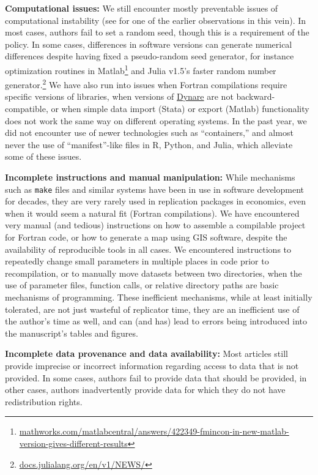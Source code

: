\documentclass[PP]{AEA}
\renewcommand{\subparagraph}[1]{\textbf{#1}}
\begin{document}
\subparagraph{Computational issues:}  We still encounter mostly preventable issues of computational instability (see \citet{mccullough_numerical_1999} for one of the earlier observations in this vein). In most cases, authors fail to set a random seed, though this is a requirement of the policy. In some cases, differences in software versions can generate numerical differences despite having fixed a pseudo-random seed generator, for instance optimization routines in Matlab\footnote{\href{https://it.mathworks.com/matlabcentral/answers/422349-fmincon-in-new-matlab-version-gives-different-results}{mathworks.com/matlabcentral/answers/422349-fmincon-in-new-matlab-version-gives-different-results}} and Julia v1.5's faster random number generator.\footnote{\href{https://web.archive.org/web/20201216032133/https://docs.julialang.org/en/v1/NEWS/}{docs.julialang.org/en/v1/NEWS/}} We have also run into issues when Fortran compilations require specific versions of libraries, when versions of \href{https://www.dynare.org/}{Dynare} are not backward-compatible, or when simple data import (Stata) or export (Matlab) functionality does not work the same way on different operating systems. In the past year, we did not encounter use of newer technologies such as ``containers,'' and almost never the use of ``manifest''-like files in R, Python, and Julia, which alleviate some of these issues.  

\subparagraph{Incomplete instructions and manual manipulation:} While mechanisms such as \texttt{make} files and similar systems have been in use in software development for decades, they are very rarely used in replication packages in economics, even when it would seem a natural fit (Fortran compilations). We have encountered very manual (and tedious) instructions on how to assemble a compilable project for Fortran code, or how to generate a map using GIS software, despite the availability of reproducible tools in all cases. We encountered instructions to repeatedly change small parameters in multiple places in code prior to recompilation, or to manually move datasets between two directories, when the use of parameter files, function calls, or relative directory paths are basic mechanisms of programming. These inefficient mechanisms, while at least initially tolerated, are not just wasteful of replicator time, they are an inefficient use of the author's time as well, and can (and has) lead to errors being introduced into the manuscript's tables and figures. 

\subparagraph{Incomplete data provenance and data availability:} Most articles still provide imprecise or incorrect information regarding access to data that is not provided. In some cases, authors fail to provide data that should be provided, in other cases, authors inadvertently provide data for which they do not have redistribution rights. 
\end{document}
